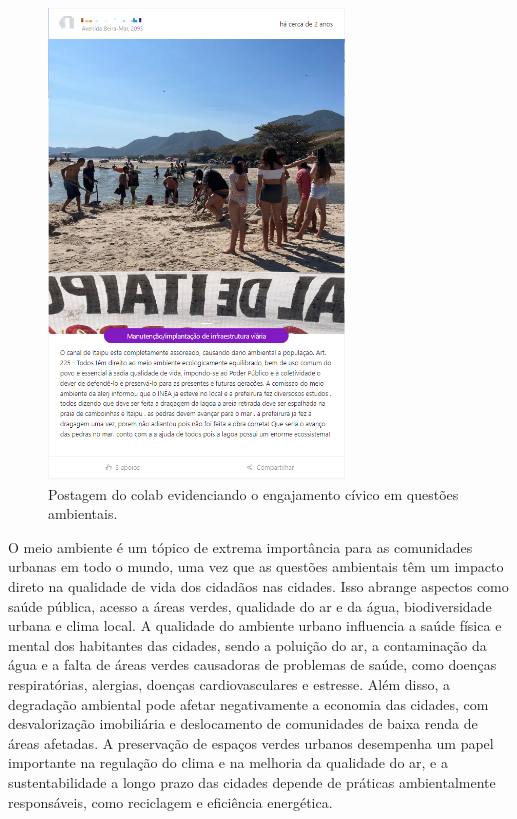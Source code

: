 \begin{figure}[htb]
	\centering
	\includegraphics[width=0.7\textwidth]{images/colab_posts_social_environment.png}
	\caption{Postagem do colab evidenciando o engajamento cívico em questões ambientais.}
	\label{fig:colab_posts_social_environment}
\end{figure}

O meio ambiente é um tópico de extrema importância para as comunidades urbanas em todo o mundo, uma vez que as questões ambientais têm um impacto direto na qualidade de vida dos cidadãos nas cidades. Isso abrange aspectos como saúde pública, acesso a áreas verdes, qualidade do ar e da água, biodiversidade urbana e clima local. A qualidade do ambiente urbano influencia a saúde física e mental dos habitantes das cidades, sendo a poluição do ar, a contaminação da água e a falta de áreas verdes causadoras de problemas de saúde, como doenças respiratórias, alergias, doenças cardiovasculares e estresse. Além disso, a degradação ambiental pode afetar negativamente a economia das cidades, com desvalorização imobiliária e deslocamento de comunidades de baixa renda de áreas afetadas. A preservação de espaços verdes urbanos desempenha um papel importante na regulação do clima e na melhoria da qualidade do ar, e a sustentabilidade a longo prazo das cidades depende de práticas ambientalmente responsáveis, como reciclagem e eficiência energética.

